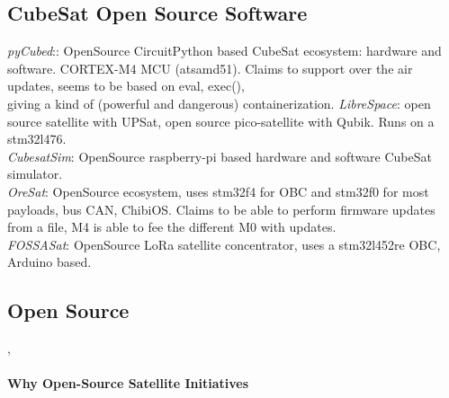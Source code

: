 \subsection{CubeSat Open Source Software}
\label{sec:open-source-cubesat}
\textit{pyCubed}:\cite{Holliday2019PyCubed}: OpenSource CircuitPython based CubeSat
ecosystem: hardware and software. CORTEX-M4 MCU (atsamd51). Claims to support
over the air updates, seems to be based on eval, exec(),\\
giving a kind of (powerful and dangerous) containerization.
\textit{LibreSpace}: \cite{librespace} open source satellite with UPSat, open source pico-satellite
with Qubik. Runs on a stm32l476.\\
\textit{CubesatSim}:\cite{amsatcubesat} OpenSource raspberry-pi based hardware and
software CubeSat simulator.\\
\textit{OreSat}\cite{spivey2021oresat}: OpenSource ecosystem, uses stm32f4 for OBC
and stm32f0 for most payloads, bus CAN, ChibiOS. Claims to be able to perform
firmware updates from a file, M4 is able to fee the different M0 with updates.\\
\textit{FOSSASat}: OpenSource LoRa satellite concentrator, uses a stm32l452re OBC,
Arduino based.\\


\fi

\iffalse

\subsection{Open Source} \cite{shalashov2021OpenSourceCubeSatReview}, \cite{Holliday2019PyCubed}
\paragraph*{Why Open-Source Satellite Initiatives}
